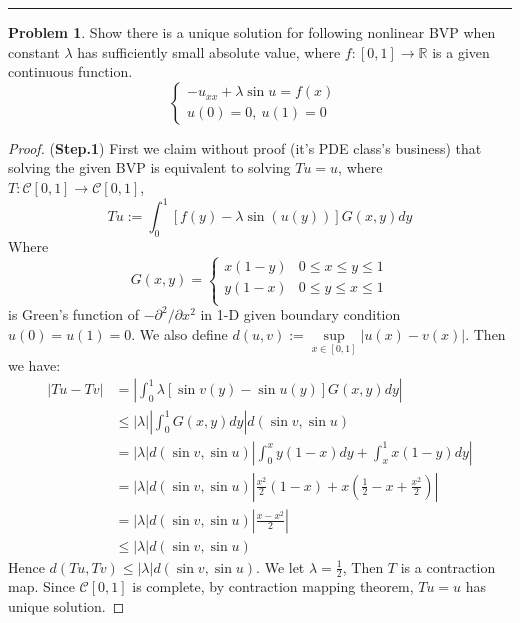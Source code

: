 \documentclass[a4paper, 10pt]{article}
\theoremstyle{definition}
\newtheorem{problem}{Problem}
\theoremstyle{hSol}
\begin{document}
\noindent\rule{16cm}{0.4pt}

\begin{problem} Show there is a unique solution for following nonlinear BVP when constant $\lambda$ has sufficiently small absolute value, where $f:[0,1]\to \mathbb{R}$ is a given continuous function.
$$
  \begin{cases} 
    -u_{xx} + \lambda \sin u = f(x) & \\
    u(0) = 0,~u(1)=0
  \end{cases}
$$
\end{problem}
\begin{proof} (\textbf{Step.1}) First we claim without proof (it's PDE class's business) that solving the given BVP is equivalent to solving $Tu=u$, where $T: \mathcal{C}[0,1]\to \mathcal{C}[0,1]$, 
\begin{equation}
  Tu:=\int_{0}^1 [f(y)-\lambda\sin(u(y))] G(x,y) dy
\end{equation}
Where
\begin{equation}
  G(x,y)=\begin{cases}
  x(1-y) & 0\leq x \leq y \leq 1\\
  y(1-x) & 0\leq y \leq x \leq 1\\
  \end{cases}
\end{equation}
is Green's function of $-\partial^2 / \partial x^2$ in 1-D given boundary condition $u(0)=u(1)=0$. We also define $d(u,v):=\sup\limits_{x\in[0,1]}|u(x)-v(x)|$. Then we have:
\begin{equation}
  \begin{split}
    |Tu-Tv| &= \left|\int_{0}^1 \lambda[\sin v(y)-\sin u(y)] G(x,y) dy\right| \\
    & \leq |\lambda|\left|\int_{0}^1 G(x,y) dy\right|d(\sin v, \sin u) \\
    & = |\lambda| d(\sin v, \sin u) \left|\int_{0}^x y(1-x) dy + \int_{x}^1 x(1-y) dy\right| \\
    & = |\lambda| d(\sin v, \sin u) \left|\frac{x^2}{2}(1-x) + x(\frac{1}{2}-x+\frac{x^2}{2})\right| \\
    & = |\lambda| d(\sin v, \sin u) \left|\frac{x-x^2}{2}\right|\\
    & \leq |\lambda| d(\sin v, \sin u)
  \end{split}
\end{equation}
Hence $d(Tu, Tv) \leq |\lambda| d(\sin v, \sin u)$. We let $\lambda = \frac{1}{2}$, Then $T$ is a contraction map. Since $\mathcal{C}[0,1]$ is complete, by contraction mapping theorem, $Tu=u$ has unique solution.
\end{proof}
\end{document}
